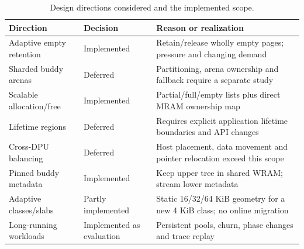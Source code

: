 \begin{table}[t]
\caption{Design directions considered and the implemented scope.}\label{tab:ideas}
\centering\small
\begin{tabular}{@{}p{}p{}p{}@{}}\toprule
Direction & Decision & Reason or realization \\ \midrule
Adaptive empty retention & Implemented & Retain/release wholly empty pages; pressure and changing demand \\
Sharded buddy arenas & Deferred & Partitioning, arena ownership and fallback require a separate study \\
Scalable allocation/free & Implemented & Partial/full/empty lists plus direct MRAM ownership map \\
Lifetime regions & Deferred & Requires explicit application lifetime boundaries and API changes \\
Cross-DPU balancing & Deferred & Host placement, data movement and pointer relocation exceed this scope \\
Pinned buddy metadata & Implemented & Keep upper tree in shared WRAM; stream lower metadata \\
Adaptive classes/slabs & Partly implemented & Static 16/32/64 KiB geometry for a new 4 KiB class; no online migration \\
Long-running workloads & Implemented as evaluation & Persistent pools, churn, phase changes and trace replay \\
\bottomrule\end{tabular}
\end{table}
